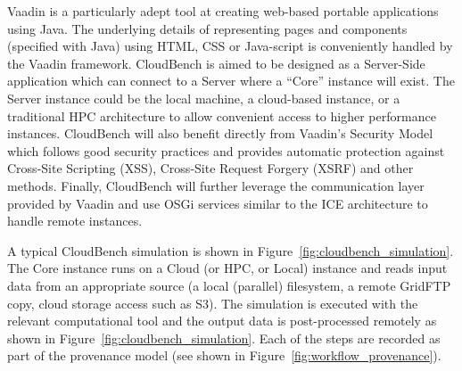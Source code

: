 Vaadin is a particularly adept tool at creating web-based portable
applications using Java. The underlying details of representing pages
and components (specified with Java) using HTML, CSS or Java-script is
conveniently handled by the Vaadin framework. CloudBench is aimed to
be designed as a Server-Side application which can connect to a Server
where a ``Core'' instance will exist. The Server instance
could be the local machine, a cloud-based instance, or a traditional
HPC architecture to allow convenient access to higher performance
instances. CloudBench will also benefit directly from Vaadin's Security 
Model~\cite{vaadin_security} which follows good security practices and provides 
automatic protection against Cross-Site Scripting (XSS), Cross-Site Request 
Forgery (XSRF) and other methods. Finally, CloudBench will further leverage the 
communication layer provided by Vaadin and use OSGi services similar to the ICE
architecture to handle remote instances.


A typical CloudBench simulation is shown in 
Figure~\ref{fig:cloudbench_simulation}. The Core instance runs on a Cloud (or 
HPC, or 
Local) instance and reads input data from an appropriate source (a local (parallel) filesystem, a remote GridFTP copy, 
cloud storage access such as S3). The simulation is executed with the relevant computational tool 
and the output data is post-processed remotely as shown in 
Figure~\ref{fig:cloudbench_simulation}. Each of the steps are recorded as part 
of 
the provenance model (see shown in Figure~\ref{fig:workflow_provenance}).

%

